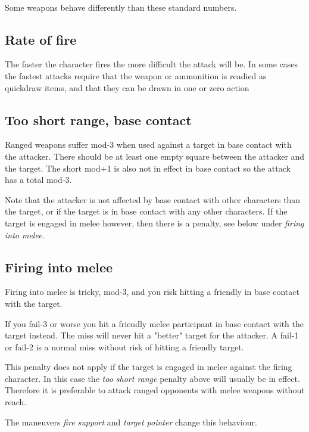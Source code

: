 \

\noindent Some weapons behave differently than these standard numbers.


\subsection*{Rate of fire}
The faster the character fires the more difficult the attack will be. In some cases the fastest attacks require that the weapon or ammunition is readied as quickdraw items, and that they can be drawn in one or zero action


\subsection*{Too short range, base contact}
Ranged weapons suffer mod-3 when used against a target in base contact with the attacker. There should be at least one empty square between the attacker and the target. The short mod+1 is also not in effect in base contact so the attack has a total mod-3.

Note that the attacker is not affected by base contact with other characters than the target, or if the target is in base contact with any other characters. If the target is engaged in melee however, then there is a penalty, see below under \emph{firing into melee}.


\subsection*{Firing into melee}
Firing into melee is tricky, mod-3, and you risk hitting a friendly in base contact with the target.

If you fail-3 or worse you hit a friendly melee participant in base contact with the target instead. The miss will never hit a "better" target for the attacker. A fail-1 or fail-2 is a normal miss without risk of hitting a friendly target.

This penalty does not apply if the target is engaged in melee against the firing character. In this case the \emph{too short range} penalty above will usually be in effect. Therefore it is preferable to attack ranged opponents with melee weapons without reach.

The maneuvers \emph{fire support} and \emph{target pointer} change this behaviour.

\

